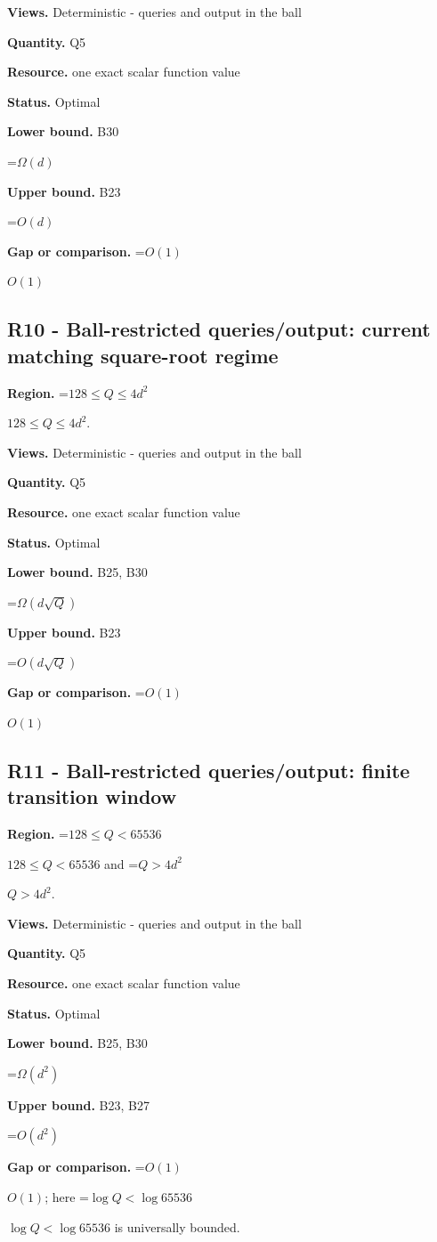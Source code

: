 \documentclass[10pt,a4paper]{article}
\newcommand{\AtlasMath}[1]{\par\begingroup\centering\setbox0=\hbox{$\displaystyle #1$}\ifdim\wd0>1.4\linewidth\typeout{ATLAS WIDE FORMULA: \the\wd0}\fi\ifdim\wd0>\linewidth\resizebox{\linewidth}{!}{\box0}\else\box0\fi\par\endgroup}
\newcommand{\AtlasInlineMath}[1]{\begingroup\setbox0=\hbox{$#1$}\ifdim\wd0>.4\linewidth\endgroup\AtlasMath{#1}\else\endgroup$#1$\fi}
\begin{document}
\textbf{Views.} Deterministic - queries and output in the ball

\textbf{Quantity.} Q5

\textbf{Resource.} one exact scalar function value

\textbf{Status.} Optimal

\textbf{Lower bound.} B30

\AtlasMath{\Omega(d)}
\textbf{Upper bound.} B23

\AtlasMath{O(d)}
\textbf{Gap or comparison.} \AtlasInlineMath{O(1)}

\subsection{R10 - Ball-restricted queries/output: current matching square-root regime}
\textbf{Region.} \AtlasInlineMath{128\le Q\le4d^2}.

\textbf{Views.} Deterministic - queries and output in the ball

\textbf{Quantity.} Q5

\textbf{Resource.} one exact scalar function value

\textbf{Status.} Optimal

\textbf{Lower bound.} B25, B30

\AtlasMath{\Omega(d\sqrt Q)}
\textbf{Upper bound.} B23

\AtlasMath{O(d\sqrt Q)}
\textbf{Gap or comparison.} \AtlasInlineMath{O(1)}

\subsection{R11 - Ball-restricted queries/output: finite transition window}
\textbf{Region.} \AtlasInlineMath{128\le Q<65536} and \AtlasInlineMath{Q>4d^2}.

\textbf{Views.} Deterministic - queries and output in the ball

\textbf{Quantity.} Q5

\textbf{Resource.} one exact scalar function value

\textbf{Status.} Optimal

\textbf{Lower bound.} B25, B30

\AtlasMath{\Omega(d^2)}
\textbf{Upper bound.} B23, B27

\AtlasMath{O(d^2)}
\textbf{Gap or comparison.} \AtlasInlineMath{O(1)}; here \AtlasInlineMath{\log Q<\log65536} is universally bounded.
\end{document}
